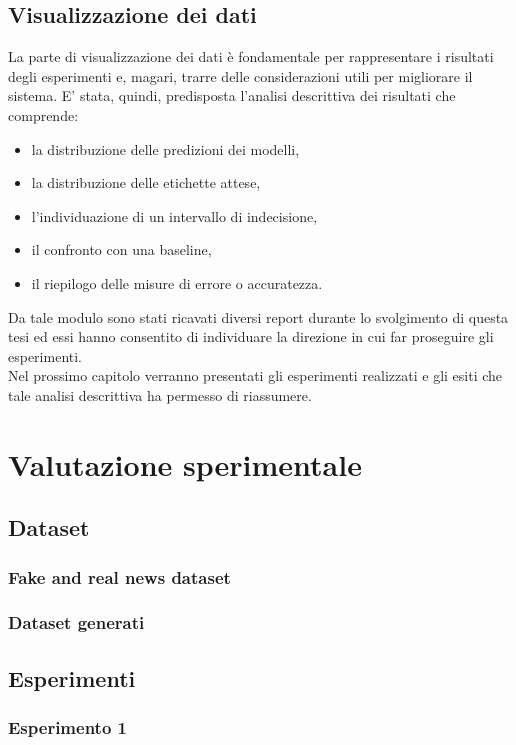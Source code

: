 \documentclass[12pt]{report}
\theoremstyle{definition}
\begin{document}
\section{Visualizzazione dei dati}\label{datavisualizationimpl}
La parte di visualizzazione dei dati è fondamentale per rappresentare i risultati degli esperimenti e, magari, trarre delle considerazioni utili per migliorare il sistema. E' stata, quindi, predisposta l'analisi descrittiva dei risultati che comprende:
\begin{itemize}
    \item la distribuzione delle predizioni dei modelli,
    \item la distribuzione delle etichette attese,
    \item l'individuazione di un intervallo di indecisione,
    \item il confronto con una baseline,
    \item il riepilogo delle misure di errore o accuratezza.
\end{itemize}
Da tale modulo sono stati ricavati diversi report durante lo svolgimento di questa tesi ed essi hanno consentito di individuare la direzione in cui far proseguire gli esperimenti.
\\
Nel prossimo capitolo verranno presentati gli esperimenti realizzati e gli esiti che tale analisi descrittiva ha permesso di riassumere.

\chapter{Valutazione sperimentale}
\label{Capitolo 4}
\onehalfspacing
\section{Dataset}
\subsection{Fake and real news dataset}
\subsection{Dataset generati}
\section{Esperimenti}
\subsection{Esperimento 1}
\end{document}
